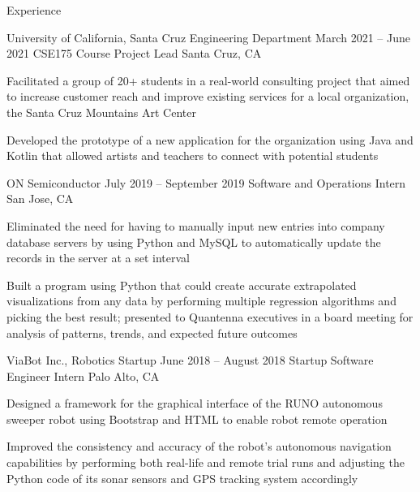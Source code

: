 \documentclass{cvtemplate}[]
\begin{document}
\begin{cvsection}{Experience}


\begin{cvsubsection}
{University of California, Santa Cruz Engineering Department}
{March 2021 -- June 2021}
{CSE175 Course Project Lead}
{Santa Cruz, CA}
\item Facilitated a group of 20+ students in a real-world consulting project that aimed to increase customer reach and improve existing services for a local organization, the Santa Cruz Mountains Art Center
\item Developed the prototype of a new application for the organization using Java and Kotlin that allowed artists and teachers to connect with potential students
\end{cvsubsection}


\begin{cvsubsection}
{ON Semiconductor}
{July 2019 -- September 2019}
{Software and Operations Intern}
{San Jose, CA}
\item Eliminated the need for having to manually input new entries into company database servers by using Python and MySQL to automatically update the records in the server at a set interval
\item Built a program using Python that could create accurate extrapolated visualizations from any data by performing multiple regression algorithms and picking the best result; presented to Quantenna executives in a board meeting for analysis of patterns, trends, and expected future outcomes
\end{cvsubsection}


\begin{cvsubsection}
{ViaBot Inc., Robotics Startup}
{June 2018 -- August 2018}
{Startup Software Engineer Intern}
{Palo Alto, CA}
\item Designed a framework for the graphical interface of the RUNO autonomous sweeper robot using Bootstrap and HTML to enable robot remote operation
\item Improved the consistency and accuracy of the robot's autonomous
navigation capabilities by performing both real-life and remote trial runs and
adjusting the Python code of its sonar sensors and GPS tracking system
accordingly
\end{cvsubsection}


\end{cvsection}
\end{document}
